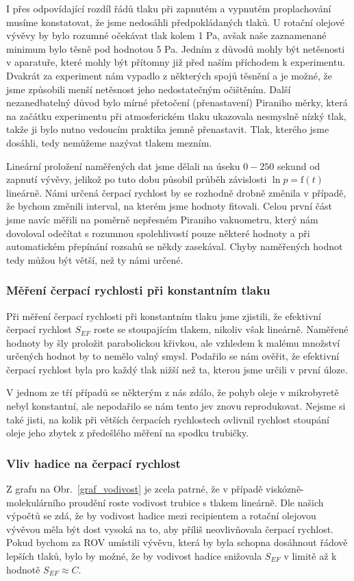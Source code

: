 \documentclass[english]{article}
\newcommand{\unit}[1]{\mathrm{#1}}
\begin{document}
		I přes odpovídající rozdíl řádů tlaku při zapnutém a vypnutém proplachování musíme konstatovat, že jsme nedosáhli předpokládaných tlaků. U rotační olejové vývěvy by bylo rozumné očekávat tlak kolem 1 Pa, avšak naše zaznamenané minimum bylo těsně pod hodnotou 5 Pa. Jedním z důvodů mohly být netěsnosti v aparatuře, které mohly být přítomny již před naším příchodem k experimentu. Dvakrát za experiment nám vypadlo z některých spojů těsnění a je možné, že jsme způsobili menší netěsnost jeho nedostatečným očištěním. Další nezanedbatelný důvod bylo mírné přetočení (přenastavení) Piraniho měrky, která na začátku experimentu při atmosferickém tlaku ukazovala nesmyslně nízký tlak, takže ji bylo nutno vedoucím praktika jemně přenastavit. Tlak, kterého jsme dosáhli, tedy nemůžeme nazývat tlakem mezním.
		
		Lineární proložení naměřených dat jsme dělali na úseku $0-250$ sekund od zapnutí vývěvy, jelikož po tuto dobu působil průběh závislosti $\ln p = \unit{f}(t)$ lineárně. Námi určená čerpací rychlost by se rozhodně drobně změnila v případě, že bychom změnili interval, na kterém jsme hodnoty fitovali. Celou první část jsme navíc měřili na poměrně nepřesném Piraniho vakuometru, který nám dovoloval odečítat s rozumnou spolehlivostí pouze některé hodnoty a při automatickém přepínání rozsahů se někdy zasekával. Chyby naměřených hodnot tedy můžou být větší, než ty námi určené.
		
	\subsubsection{Měření čerpací rychlosti při konstantním tlaku}
		Při měření čerpací rychlosti při konstantním tlaku jsme zjistili, že efektivní čerpací rychlost $S_{EF}$ roste se stoupajícím tlakem, nikoliv však lineárně. Naměřené hodnoty by šly proložit parabolickou křivkou, ale vzhledem k malému množství určených hodnot by to nemělo valný smysl. Podařilo se nám ověřit, že efektivní čerpací rychlost byla pro každý tlak nižší než ta, kterou jsme určili v první úloze. 
		
		V jednom ze tří případů se některým z nás zdálo, že pohyb oleje v mikrobyretě nebyl konstantní, ale nepodařilo se nám tento jev znovu reprodukovat. Nejsme si také jisti, na kolik při větších čerpacích rychlostech ovlivnil rychlost stoupání oleje jeho zbytek z předešlého měření na spodku trubičky.
		
	\subsubsection{Vliv hadice na čerpací rychlost}
		Z grafu na Obr.~\ref{graf_vodivost} je zcela patrné, že v případě viskózně-molekulárního proudění roste vodivost trubice s tlakem lineárně. Dle našich výpočtů se zdá, že by vodivost hadice mezi recipientem a rotační olejovou vývěvou měla být dost vysoká na to, aby příliš neovlivňovala čerpací rychlost. Pokud bychom za ROV umístili vývěvu, která by byla schopna dosáhnout řádově lepších tlaků, bylo by možné, že by vodivost hadice snižovala $S_{EF}$ v limitě až k hodnotě $S_{EF}\approx C$. 
	
\end{document}
